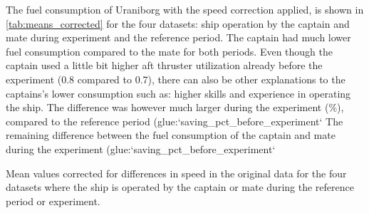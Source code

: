 \documentclass[fleqn,10pt]{olplainarticle}
\begin{document}
The fuel consumption of Uraniborg with the speed correction applied, is shown in \autoref{tab:means_corrected} for the four datasets: ship operation by the captain and mate during experiment and the reference period. The captain had much lower fuel consumption compared to the mate for both periods. Even though the captain used a little bit higher aft thruster utilization already before the experiment (0.8 compared to 0.7), there can also be other explanations to the captains's lower consumption such as: higher skills and experience in operating the ship. 
The difference was however much larger during the experiment (\savingpctexperiment \%), compared to the reference period ({glue:}`saving_pct_before_experiment` %
The remaining difference between the fuel consumption of the captain and mate during the experiment ({glue:}`saving_pct_before_experiment` %

\begin{table}[h]
    \centering
    \caption{Mean values corrected for differences in speed in the original data for the four datasets where the ship is operated by the captain or mate during the reference period or experiment.}
    \label{tab:means_corrected}
\end{table}


\end{document}
